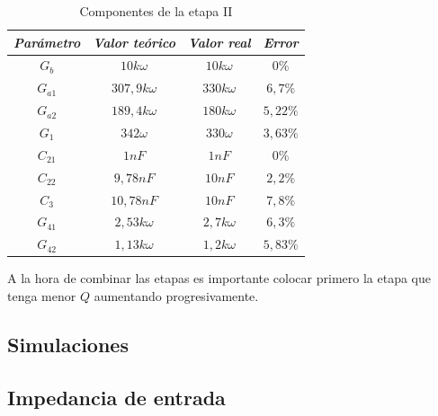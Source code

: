 \begin{table}[h!]
\begin{tabular}{|c|c|c|c|}
\hline
\textit{\textbf{Parámetro}} & \textit{\textbf{Valor teórico}} & \textit{\textbf{Valor real}} & \textit{\textbf{Error}} \\ \hline
$G_b$                       & $10k\omega$                     & $10k\omega$                  & $0\%$                    \\ \hline
$G_{a1}$                    & $307,9k\omega$                  & $330k\omega$                 & $6,7\%$                  \\ \hline
$G_{a2}$                    & $189,4k\omega$                  & $180k\omega$                 & $5,22\%$                 \\ \hline
$G_1$                       & $342\omega$                     & $330\omega$                  & $3,63\%$                 \\ \hline
$C_{21}$                    & $1nF$                           & $1nF$                        & $0\%$                    \\ \hline
$C_{22}$                    & $9,78nF$                        & $10nF$     			        & $2,2\%$                  \\ \hline
$C_3$                       & $10,78nF$                       & $10nF$			            & $7,8\%$                  \\ \hline
$G_{41}$                    & $2,53k\omega$                   & $2,7k\omega$                 & $6,3\%$                  \\ \hline
$G_{42}$                    & $1,13k\omega$                   & $1,2k\omega$                 & $5,83\%$                 \\ \hline
\end{tabular}
\centering
\caption{Componentes de la etapa II}
\end{table}

A la hora de combinar las etapas es importante colocar primero la etapa que tenga menor $Q$ aumentando progresivamente.

\subsection{Simulaciones}

\subsection{Impedancia de entrada}

